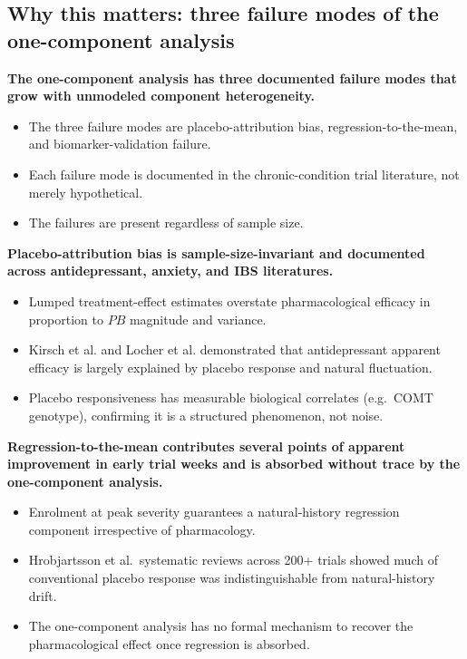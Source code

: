 \documentclass[
  11pt,
]{article}
\begin{document}
\subsection{Why this matters: three failure modes of the one-component analysis}\label{why-this-matters-three-failure-modes-of-the-one-component-analysis}

\textbf{The one-component analysis has three documented failure modes that grow with unmodeled component heterogeneity.}

\begin{itemize}\setlength{\itemsep}{2pt}\setlength{\parskip}{0pt}
\item The three failure modes are placebo-attribution bias, regression-to-the-mean, and biomarker-validation failure.
\item Each failure mode is documented in the chronic-condition trial literature, not merely hypothetical.
\item The failures are present regardless of sample size.
\end{itemize}

\textbf{Placebo-attribution bias is sample-size-invariant and documented across antidepressant, anxiety, and IBS literatures.}

\begin{itemize}\setlength{\itemsep}{2pt}\setlength{\parskip}{0pt}
\item Lumped treatment-effect estimates overstate pharmacological efficacy in proportion to $PB$ magnitude and variance.
\item Kirsch et al. and Locher et al. demonstrated that antidepressant apparent efficacy is largely explained by placebo response and natural fluctuation.
\item Placebo responsiveness has measurable biological correlates (e.g.\ COMT genotype), confirming it is a structured phenomenon, not noise.
\end{itemize}

\textbf{Regression-to-the-mean contributes several points of apparent improvement in early trial weeks and is absorbed without trace by the one-component analysis.}

\begin{itemize}\setlength{\itemsep}{2pt}\setlength{\parskip}{0pt}
\item Enrolment at peak severity guarantees a natural-history regression component irrespective of pharmacology.
\item Hrobjartsson et al.\ systematic reviews across 200+ trials showed much of conventional placebo response was indistinguishable from natural-history drift.
\item The one-component analysis has no formal mechanism to recover the pharmacological effect once regression is absorbed.
\end{itemize}
\end{document}
